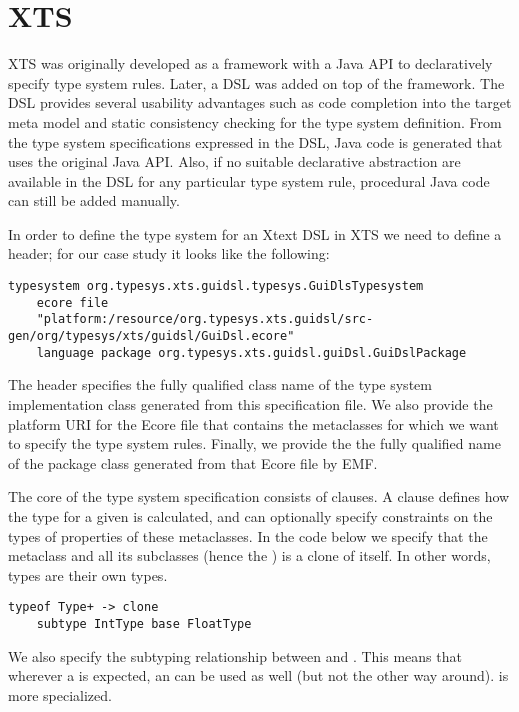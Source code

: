 \section{XTS}
\label{sec:xts}

XTS was originally developed as a framework with a Java API to declaratively
specify type system rules. Later, a DSL was added on top of the framework. The
DSL provides several usability advantages such as code completion into the
target meta model and static consistency checking for the type system
definition. From the type system specifications expressed in the DSL, Java code
is generated that uses the original Java API. Also, if no suitable
declarative abstraction are available in the DSL for any particular type system
rule, procedural Java code can still be added manually.

In order to define the type system for an Xtext DSL in XTS we need to define a
header; for our case study it looks like the following:

\begin{lstlisting}[language=xts] 
typesystem org.typesys.xts.guidsl.typesys.GuiDlsTypesystem 
    ecore file 
    "platform:/resource/org.typesys.xts.guidsl/src-gen/org/typesys/xts/guidsl/GuiDsl.ecore"
    language package org.typesys.xts.guidsl.guiDsl.GuiDslPackage 
\end{lstlisting}

The header specifies the fully qualified class name of the type system
implementation class generated from this specification file. We also provide the
platform URI for the Ecore file that contains the metaclasses for which we want
to specify the type system rules. Finally, we provide the the fully qualified
name of the package class generated from that Ecore file by EMF.

The core of the type system specification consists of  clauses. A
 clause defines how the type for a given  is calculated,
and can optionally specify constraints on the types of properties of these
metaclasses. In the code below we specify that the  metaclass and all
its subclasses (hence the \ic{+}) is a clone of itself. In other words, types
are their own types.

\begin{lstlisting}[language=xts] 
    typeof Type+ -> clone
    subtype IntType base FloatType
\end{lstlisting}

We also specify the subtyping relationship between  and
. This means that wherever a  is expected, an
 can be used as well (but not the other way around).  is
more specialized.

